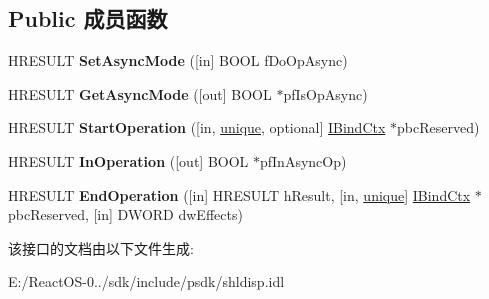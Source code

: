 \subsection*{Public 成员函数}
\begin{DoxyCompactItemize}
\item 
\mbox{\label{interface_i_async_operation_a987fa32a7015976940b216a63876ec43}} 
H\+R\+E\+S\+U\+LT {\bfseries Set\+Async\+Mode} (\mbox{[}in\mbox{]} B\+O\+OL f\+Do\+Op\+Async)
\item 
\mbox{\label{interface_i_async_operation_a5ec4636201b146cbf101b85470cf1497}} 
H\+R\+E\+S\+U\+LT {\bfseries Get\+Async\+Mode} (\mbox{[}out\mbox{]} B\+O\+OL $\ast$pf\+Is\+Op\+Async)
\item 
\mbox{\label{interface_i_async_operation_a5d6e5e2ec536c2c459a1254e10fba64e}} 
H\+R\+E\+S\+U\+LT {\bfseries Start\+Operation} (\mbox{[}in, \hyperlink{interfaceunique}{unique}, optional\mbox{]} \hyperlink{interface_i_bind_ctx}{I\+Bind\+Ctx} $\ast$pbc\+Reserved)
\item 
\mbox{\label{interface_i_async_operation_aabaa0ccab01adda3884fbda63b395d11}} 
H\+R\+E\+S\+U\+LT {\bfseries In\+Operation} (\mbox{[}out\mbox{]} B\+O\+OL $\ast$pf\+In\+Async\+Op)
\item 
\mbox{\label{interface_i_async_operation_a7afeda092ee29736046d01333891e737}} 
H\+R\+E\+S\+U\+LT {\bfseries End\+Operation} (\mbox{[}in\mbox{]} H\+R\+E\+S\+U\+LT h\+Result, \mbox{[}in, \hyperlink{interfaceunique}{unique}\mbox{]} \hyperlink{interface_i_bind_ctx}{I\+Bind\+Ctx} $\ast$pbc\+Reserved, \mbox{[}in\mbox{]} D\+W\+O\+RD dw\+Effects)
\end{DoxyCompactItemize}


该接口的文档由以下文件生成\+:\begin{DoxyCompactItemize}
\item 
E\+:/\+React\+O\+S-\/0../sdk/include/psdk/shldisp.\+idl\end{DoxyCompactItemize}
